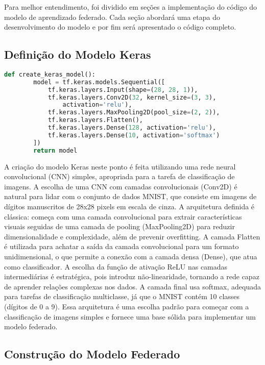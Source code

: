 Para melhor entendimento, foi dividido em seções a implementação do código do modelo de aprendizado federado. Cada seção abordará uma etapa do desenvolvimento do modelo e por fim será apresentado o código completo.

\subsection{Definição do Modelo Keras}

\begin{lstlisting}[language=Python, caption={Função para criar um modelo Keras}, label={lst:create_keras_model}]
    def create_keras_model():
        model = tf.keras.models.Sequential([
            tf.keras.layers.Input(shape=(28, 28, 1)),
            tf.keras.layers.Conv2D(32, kernel_size=(3, 3), 
                activation='relu'),
            tf.keras.layers.MaxPooling2D(pool_size=(2, 2)),
            tf.keras.layers.Flatten(),
            tf.keras.layers.Dense(128, activation='relu'),
            tf.keras.layers.Dense(10, activation='softmax')
        ])
        return model
\end{lstlisting}
    

A criação do modelo Keras neste ponto é feita utilizando uma rede neural convolucional (CNN) simples, apropriada para a tarefa de classificação de imagens. A escolha de uma CNN com camadas convolucionais (Conv2D) é natural para lidar com o conjunto de dados MNIST, que consiste em imagens de dígitos manuscritos de 28x28 pixels em escala de cinza. A arquitetura definida é clássica: começa com uma camada convolucional para extrair características visuais seguidas de uma camada de pooling (MaxPooling2D) para reduzir dimensionalidade e complexidade, além de prevenir overfitting. A camada Flatten é utilizada para achatar a saída da camada convolucional para um formato unidimensional, o que permite a conexão com a camada densa (Dense), que atua como classificador. A escolha da função de ativação ReLU nas camadas intermediárias é estratégica, pois introduz não-linearidade, tornando a rede capaz de aprender relações complexas nos dados. A camada final usa softmax, adequada para tarefas de classificação multiclasse, já que o MNIST contém 10 classes (dígitos de 0 a 9). Essa arquitetura é uma escolha padrão para começar com a classificação de imagens simples e fornece uma base sólida para implementar um modelo federado.

\subsection{Construção do Modelo Federado}

